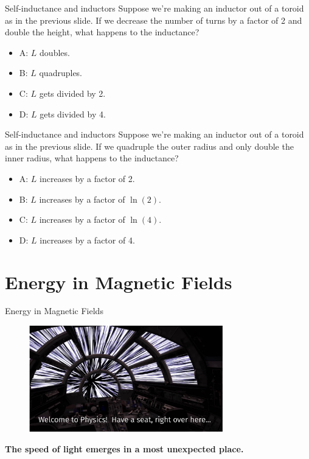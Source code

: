 \documentclass{beamer}
\begin{document}
\begin{frame}{Self-inductance and inductors}
Suppose we're making an inductor out of a toroid as in the previous slide.  If we decrease the number of turns by a factor of 2 and double the height, what happens to the inductance?
\begin{itemize}
\item A: $L$ doubles.
\item B: $L$ quadruples.
\item C: $L$ gets divided by 2.
\item D: $L$ gets divided by 4.
\end{itemize}
\end{frame}

\begin{frame}{Self-inductance and inductors}
Suppose we're making an inductor out of a toroid as in the previous slide.  If we quadruple the outer radius and only double the inner radius, what happens to the inductance?
\begin{itemize}
\item A: $L$ increases by a factor of 2.
\item B: $L$ increases by a factor of $\ln(2)$.
\item C: $L$ increases by a factor of $\ln(4)$.
\item D: $L$ increases by a factor of 4.
\end{itemize}
\end{frame}

\section{Energy in Magnetic Fields}

\begin{frame}{Energy in Magnetic Fields}
\begin{figure}
\center
\includegraphics[width=0.75\textwidth]{figures/hyper.pdf}
\end{figure}
\textbf{The speed of light emerges in a most unexpected place.}
\end{frame}
\end{document}
